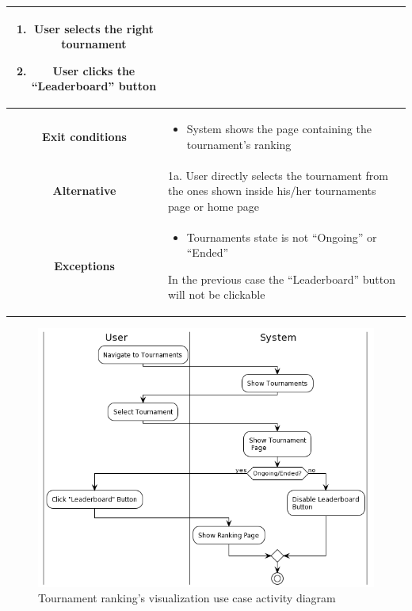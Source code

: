 \begin{center}
\begin{tabular}{ |c|m{10cm}| }
\begin{enumerate}
            \item User selects the right tournament
            \item User clicks the “Leaderboard” button
        \end{enumerate} \\
        \hline
        \textbf{Exit conditions} &
        \begin{itemize}
            \item System shows the page containing the tournament’s ranking
        \end{itemize} \\
        \hline
        \textbf{Alternative} & 
            1a. User directly selects the tournament from the ones shown inside his/her tournaments page or home page \\
        \hline
        \textbf{Exceptions} & 
        \begin{itemize}
            \item Tournaments state is not “Ongoing” or “Ended”
        \end{itemize} 
        In the previous case the “Leaderboard” button will not be clickable \\
        \hline
    \end{tabular}
    \begin{figure}[H]
        \hspace{30px}
        \includegraphics[scale=0.5]{Diagrams/activity_visualizetournamentrank.png}
        \caption{Tournament ranking's visualization use case activity diagram}
    \end{figure}

\end{center}
